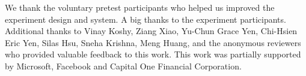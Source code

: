 \begin{acks}
We thank the voluntary pretest participants who helped us improved the experiment design and system. A big thanks to the experiment participants. Additional thanks to Vinay Koshy, Ziang Xiao, Yu-Chun Grace Yen, Chi-Hsien Eric Yen, Silas Hsu, Sneha Krishna, Meng Huang, and the anonymous reviewers who provided valuable feedback to this work. This work was partially supported by Microsoft, Facebook and Capital One Financial Corporation. 
\end{acks}


